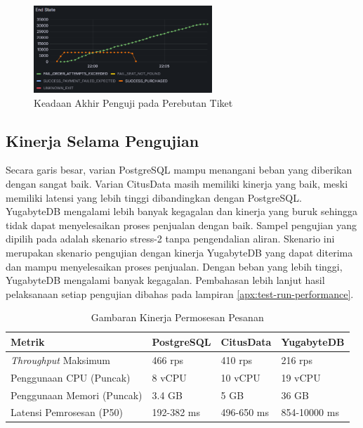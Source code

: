 \begin{figure}[htbp]
    \centering
    \includegraphics[width=0.6\textwidth]{resources/chapter-4/pattern-sim-k6.png}
    \caption{Keadaan Akhir Penguji pada Perebutan Tiket}
    \label{fig:pattern-sim-k6}
\end{figure}


\subsection{Kinerja Selama Pengujian}

Secara garis besar, varian PostgreSQL mampu menangani beban yang diberikan dengan sangat baik. Varian CitusData masih memiliki kinerja yang baik, meski memiliki latensi yang lebih tinggi dibandingkan dengan PostgreSQL. YugabyteDB mengalami lebih banyak kegagalan dan kinerja yang buruk sehingga tidak dapat menyelesaikan proses penjualan dengan baik. Sampel pengujian yang dipilih pada adalah skenario stress-2 tanpa pengendalian aliran. Skenario ini merupakan skenario pengujian dengan kinerja YugabyteDB yang dapat diterima dan mampu menyelesaikan proses penjualan. Dengan beban yang lebih tinggi, YugabyteDB mengalami banyak kegagalan. Pembahasan lebih lanjut hasil pelaksanaan setiap pengujian dibahas pada lampiran \ref{apx:test-run-performance}.

\begin{table}[h]
    \centering
    \caption{Gambaran Kinerja Permosesan Pesanan}
    \label{table:kinerja-pemrosesan-pesanan}
    \begin{tabular}{|l|l|l|l|}
        \hline
        \textbf{Metrik}              & \textbf{PostgreSQL} & \textbf{CitusData} & \textbf{YugabyteDB} \\
        \hline
        \textit{Throughput} Maksimum & 466 rps             & 410 rps            & 216 rps             \\
        \hline
        Penggunaan CPU (Puncak)      & 8 vCPU              & 10 vCPU            & 19 vCPU             \\
        \hline
        Penggunaan Memori (Puncak)   & 3.4 GB              & 5 GB               & 36 GB               \\
        \hline
        Latensi Pemrosesan (P50)     & 192-382 ms          & 496-650 ms         & 854-10000 ms        \\
        \hline
    \end{tabular}
\end{table}

